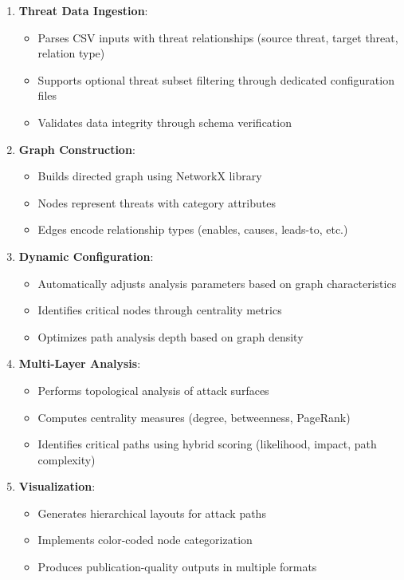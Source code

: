 \documentclass[binding=0.6cm]{sapthesis}
\begin{document}
\begin{enumerate}
\item \textbf{Threat Data Ingestion}:
\begin{itemize}
\item Parses CSV inputs with threat relationships (source threat, target threat, relation type)
\item Supports optional threat subset filtering through dedicated configuration files
\item Validates data integrity through schema verification
\end{itemize}

\item \textbf{Graph Construction}:
\begin{itemize}
    \item Builds directed graph using NetworkX library
    \item Nodes represent threats with category attributes
    \item Edges encode relationship types (enables, causes, leads-to, etc.)
\end{itemize}

\item \textbf{Dynamic Configuration}:
\begin{itemize}
    \item Automatically adjusts analysis parameters based on graph characteristics
    \item Identifies critical nodes through centrality metrics
    \item Optimizes path analysis depth based on graph density
\end{itemize}

\item \textbf{Multi-Layer Analysis}:
\begin{itemize}
    \item Performs topological analysis of attack surfaces
    \item Computes centrality measures (degree, betweenness, PageRank)
    \item Identifies critical paths using hybrid scoring (likelihood, impact, path complexity)
\end{itemize}

\item \textbf{Visualization}:
\begin{itemize}
    \item Generates hierarchical layouts for attack paths
    \item Implements color-coded node categorization
    \item Produces publication-quality outputs in multiple formats
\end{itemize}


\end{enumerate}
\end{document}
